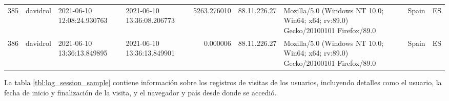 \documentclass[a4paper, 12pt]{book}
\begin{document}
\begin{table}[!htb]
\begin{tabular}{r l l l r l l l l}
385 & davidrol    & 2021-06-10 12:08:24.930763 & 2021-06-10 13:36:08.206773 & 5263.276010 & 88.11.226.27 & Mozilla/5.0 (Windows NT 10.0; Win64; x64; rv:89.0) Gecko/20100101 Firefox/89.0                                & Spain & ES \\
386 & davidrol    & 2021-06-10 13:36:13.849895 & 2021-06-10 13:36:13.849901 &    0.000006 & 88.11.226.27 & Mozilla/5.0 (Windows NT 10.0; Win64; x64; rv:89.0) Gecko/20100101 Firefox/89.0                                & Spain & ES \\
\bottomrule
\end{tabular}
\end{table}



La tabla \ref{tbl:log_session_sample} contiene información sobre los registros de visitas de los usuarios, incluyendo detalles como el usuario, la fecha de inicio y finalización de la visita, y el navegador y país desde donde se accedió.
\end{document}
